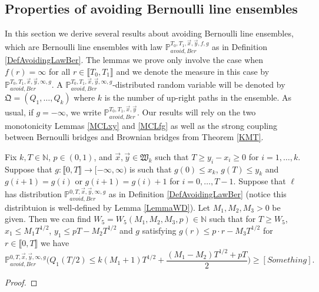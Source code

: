 \subsection{Properties of avoiding Bernoulli line ensembles}\label{Section3.3}  In this section we derive several results about avoiding Bernoulli line ensembles, which are Bernoulli line ensembles with law $\mathbb{P}_{avoid, Ber}^{T_0,T_1, \vec{x}, \vec{y}, f, g}$ as in Definition \ref{DefAvoidingLawBer}. The lemmas we prove only involve the case when $f(r) = \infty$ for all $r \in \llbracket T_0, T_1 \rrbracket$ and we denote the measure in this case by $\mathbb{P}_{avoid, Ber}^{T_0,T_1, \vec{x}, \vec{y}, \infty, g}$. A $\mathbb{P}_{avoid, Ber}^{T_0,T_1, \vec{x}, \vec{y}, \infty, g}$-distributed random variable will be denoted by $\mathfrak{Q} = (Q_1, \dots, Q_k)$ where $k$ is the number of up-right paths in the ensemble. As usual, if $g=-\infty$, we write $\mathbb{P}_{avoid, Ber}^{T_0,T_1, \vec{x}, \vec{y}}$. Our results will rely on the two monotonicity Lemmas \ref{MCLxy} and \ref{MCLfg} as well as the strong coupling between Bernoulli bridges and Brownian bridges from Theorem \ref{KMT}.





\begin{lemma}\label{LemmaDip}Fix $k, T \in \mathbb{N}$, $p \in (0,1)$, and $\vec{x}, \vec{y} \in \mathfrak{W}_k$ such that $T \geq y_i-x_i \geq 0$ for $i = 1, \dots, k$. Suppose that $g: \llbracket 0, T \rrbracket \rightarrow [-\infty, \infty)$ is such that $g(0) \leq x_k$, $g(T) \leq y_k$ and $g(i +1 ) = g(i) $ or $g(i+1) = g(i) +1$ for $i = 0, \dots, T-1$. Suppose that $\ell$ has distribution $\mathbb{P}^{0,T,\vec{x},\vec{y}, \infty ,g}_{avoid,Ber}$ as in Definition \ref{DefAvoidingLawBer} (notice this distribtuion is well-defined by Lemma \ref{LemmaWD}). Let $M_1,M_2, M_3 > 0$ be given. Then we can find $W_5 = W_5(M_1,M_2, M_3, p) \in \mathbb{N}$ such that for $T \geq W_5$, $ x_1 \leq M_1T^{1/2}$, $ y_1 \leq pT -  M_2 T^{1/2}$ and $g$ satisfying $g(r) \leq p \cdot r - M_3T^{1/2}$ for $r \in \llbracket 0, T\rrbracket$ we have
\begin{equation}\label{eqDip}
\mathbb{P}^{0,T,\vec{x},\vec{y}, \infty ,g}_{avoid,Ber}\bigg( Q_1( T/2 )  \leq k (M_1+1)T^{1/2} +  \frac{ (M_1 - M_2)T^{1/2} + p T}{2}  \bigg) \geq [Something].
\end{equation}
\end{lemma}
\begin{proof}
\end{proof}

